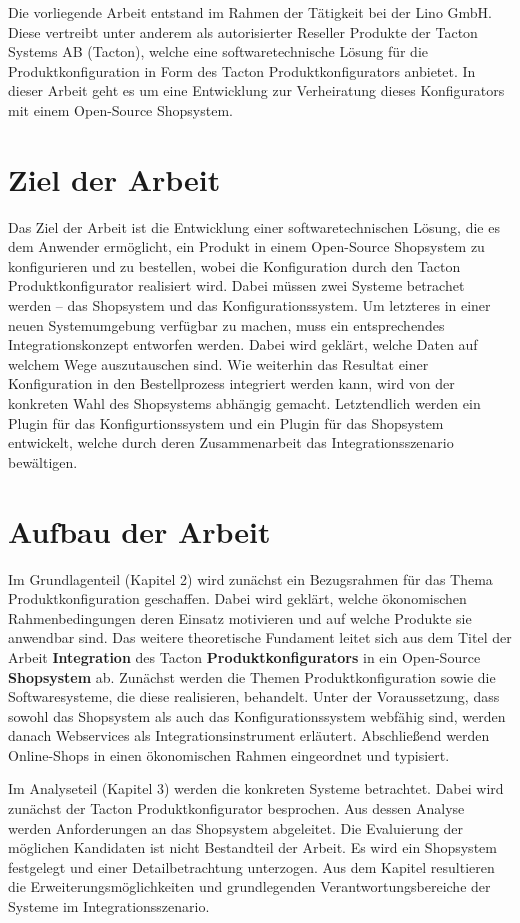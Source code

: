 \documentclass[11pt, a4paper, titlepage, listof=totoc, bibliography=totoc, index=totoc, twoside, openright, headings=normal, draft]{scrreprt}
\begin{document}
Die vorliegende Arbeit entstand im Rahmen der Tätigkeit bei der Lino GmbH. Diese vertreibt unter anderem als autorisierter Reseller Produkte der Tacton Systems AB (Tacton), welche eine softwaretechnische Lösung für die Produktkonfiguration in Form des Tacton Produktkonfigurators anbietet. In dieser Arbeit geht es um eine Entwicklung zur Verheiratung dieses Konfigurators mit einem Open-Source Shopsystem.

\section{Ziel der Arbeit}
Das Ziel der Arbeit ist die Entwicklung einer softwaretechnischen Lösung, die es dem Anwender ermöglicht, ein Produkt in einem Open-Source Shopsystem zu konfigurieren und zu bestellen, wobei die Konfiguration durch den Tacton Produktkonfigurator realisiert wird. Dabei müssen zwei Systeme betrachet werden -- das Shopsystem und das Konfigurationssystem. Um letzteres in einer neuen Systemumgebung verfügbar zu machen, muss ein entsprechendes Integrationskonzept entworfen werden. Dabei wird geklärt, welche Daten auf welchem Wege auszutauschen sind. Wie weiterhin das Resultat einer Konfiguration in den Bestellprozess integriert werden kann, wird von der konkreten Wahl des Shopsystems abhängig gemacht. Letztendlich werden ein Plugin für das Konfigurtionssystem und ein Plugin für das Shopsystem entwickelt, welche durch deren Zusammenarbeit das Integrationsszenario bewältigen.

\section{Aufbau der Arbeit}
Im Grundlagenteil (Kapitel 2) wird zunächst ein Bezugsrahmen für das Thema Produktkonfiguration geschaffen. Dabei wird geklärt, welche ökonomischen Rahmenbedingungen deren Einsatz motivieren und auf welche Produkte sie anwendbar sind. Das weitere theoretische Fundament leitet sich aus dem Titel der Arbeit \glqq \textbf{Integration} des Tacton \textbf{Produktkonfigurators} in ein Open-Source \textbf{Shopsystem}\grqq{} ab. Zunächst werden die Themen Produktkonfiguration sowie die Softwaresysteme, die diese realisieren, behandelt. Unter der Voraussetzung, dass sowohl das Shopsystem als auch das Konfigurationssystem webfähig sind, werden danach Webservices als Integrationsinstrument erläutert. Abschließend werden Online-Shops in einen ökonomischen Rahmen eingeordnet und typisiert. 

Im Analyseteil (Kapitel 3) werden die konkreten Systeme betrachtet. Dabei wird zunächst der Tacton Produktkonfigurator besprochen. Aus dessen Analyse werden Anforderungen an das Shopsystem abgeleitet. Die Evaluierung der möglichen Kandidaten ist nicht Bestandteil der Arbeit. Es wird ein Shopsystem festgelegt und einer Detailbetrachtung unterzogen. Aus dem Kapitel resultieren die Erweiterungsmöglichkeiten und grundlegenden Verantwortungsbereiche der Systeme im Integrationsszenario.
\end{document}
